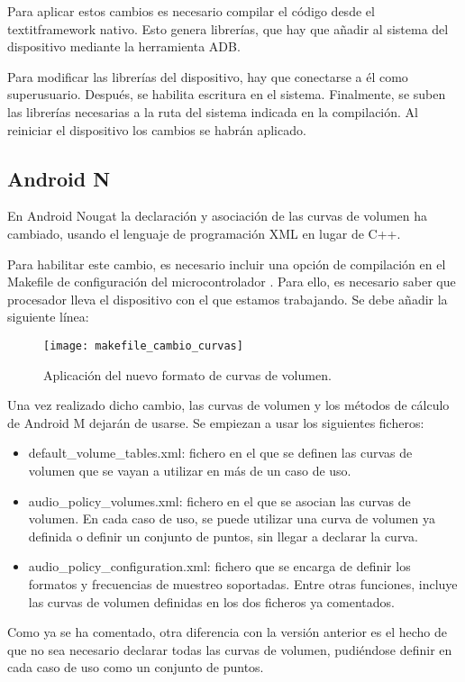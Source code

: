 Para aplicar estos cambios es necesario compilar el código desde el textit{framework} nativo. Esto genera librerías, que hay que añadir al sistema del dispositivo mediante la herramienta \gls{ADB}. 

Para modificar las librerías del dispositivo, hay que conectarse a él como superusuario. Después, se habilita escritura en el sistema. Finalmente, se suben las librerías necesarias a la ruta del sistema indicada en la compilación. Al reiniciar el dispositivo los cambios se habrán aplicado.

\subsection{Android N}
En Android Nougat la declaración y asociación de las curvas de volumen ha cambiado, usando el lenguaje de programación XML en lugar de C++.

Para habilitar este cambio, es necesario incluir una opción de compilación en el Makefile de configuración del microcontrolador \cite{curves_android_n}. Para ello, es necesario saber que procesador lleva el dispositivo con el que estamos trabajando. Se debe añadir la siguiente línea:

\begin{figure}[H]
	\centering
	\texttt{[image: makefile\_cambio\_curvas]}
	\caption{Aplicación del nuevo formato de curvas de volumen.}
	\label{fig:mk_cambio_curvas}
\end{figure}

Una vez realizado dicho cambio, las curvas de volumen y los métodos de cálculo de Android M dejarán de usarse. Se empiezan a usar los siguientes ficheros:
\begin{itemize}
	\item{default\_volume\_tables.xml: fichero en el que se definen las curvas de volumen que se vayan a utilizar en más de un caso de uso.}
	\item{audio\_policy\_volumes.xml: fichero en el que se asocian las curvas de volumen. En cada caso de uso, se puede utilizar una curva de volumen ya definida o definir un conjunto de puntos, sin llegar a declarar la curva.}
	\item{audio\_policy\_configuration.xml: fichero que se encarga de definir los formatos y frecuencias de muestreo soportadas. Entre otras funciones, incluye las curvas de volumen definidas en los dos ficheros ya comentados.}
\end{itemize}

Como ya se ha comentado, otra diferencia con la versión anterior es el hecho de que no sea necesario declarar todas las curvas de volumen, pudiéndose definir en cada caso de uso como un conjunto de puntos.

